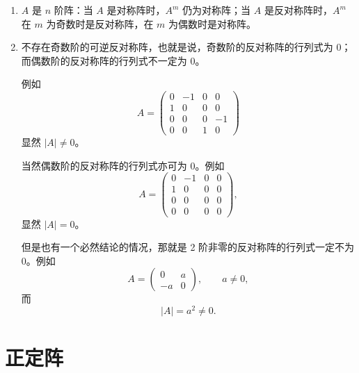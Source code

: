 \begin{enumerate}
\item $A$ 是 $n$ 阶阵：当 $A$ 是对称阵时，$A^m$ 仍为对称阵；当 $A$ 是反对称阵时，$A^m$ 在 $m$ 为奇数时是反对称阵，在 $m$ 为偶数时是对称阵。

\item 不存在奇数阶的可逆反对称阵，也就是说，奇数阶的反对称阵的行列式为 0；而偶数阶的反对称阵的行列式不一定为 0。

例如
\[
 A=\begin{pmatrix}
 0&-1&0&0\\
 1&0&0&0\\
 0&0&0&-1\\
 0&0&1&0
 \end{pmatrix}
\]
显然 $|A|\ne0$。

当然偶数阶的反对称阵的行列式亦可为 0。例如
\[
 A=\begin{pmatrix}
 0&-1&0&0\\
 1&0&0&0\\
 0&0&0&0\\
 0&0&0&0
 \end{pmatrix},
\]
显然 $|A|=0$。

但是也有一个必然结论的情况，那就是 2 阶非零的反对称阵的行列式一定不为 0。例如
\[
 A=\begin{pmatrix}0&a\\-a&0\end{pmatrix},\qquad a\ne0,
\]
而
\[
 |A|=a^2\ne0.
\]
\end{enumerate}

\section{正定阵}

